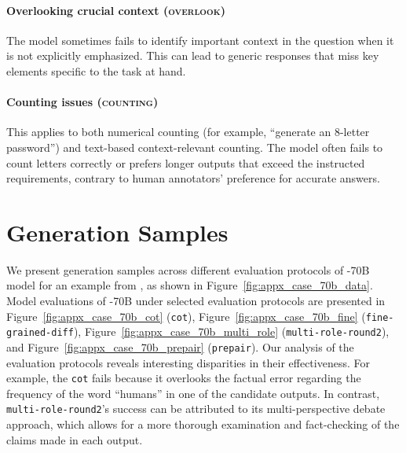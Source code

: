 \paragraph{Overlooking crucial context \textsc{(overlook)}} The model sometimes fails to identify important context in the question when it is not explicitly emphasized. This can lead to generic responses that miss key elements specific to the task at hand.

\paragraph{Counting issues \textsc{(counting)}} This applies to both numerical counting (for example, ``generate an 8-letter password'') and text-based context-relevant counting. The model often fails to count letters correctly or prefers longer outputs that exceed the instructed requirements, contrary to human annotators' preference for accurate answers.





\section{Generation Samples}
\label{appx_case_study_llama3_70b}
We present generation samples across different evaluation protocols of -70B model for an example from \llmbarnatural, as shown in Figure~\ref{fig:appx_case_70b_data}. Model evaluations of -70B under selected evaluation protocols are presented in Figure~\ref{fig:appx_case_70b_cot} (\texttt{cot}), Figure~\ref{fig:appx_case_70b_fine} (\texttt{fine-grained-diff}), Figure~\ref{fig:appx_case_70b_multi_role} (\texttt{multi-role-round2}),  and Figure~\ref{fig:appx_case_70b_prepair} (\texttt{prepair}).
Our analysis of the evaluation protocols reveals interesting disparities in their effectiveness. For example, the \texttt{cot} fails because it overlooks the factual error regarding the frequency of the word ``humans'' in one of the candidate outputs. In contrast, 
\texttt{multi-role-round2}'s success can be attributed to its multi-perspective debate approach, which allows for a more thorough examination and fact-checking of the claims made in each output.



%









